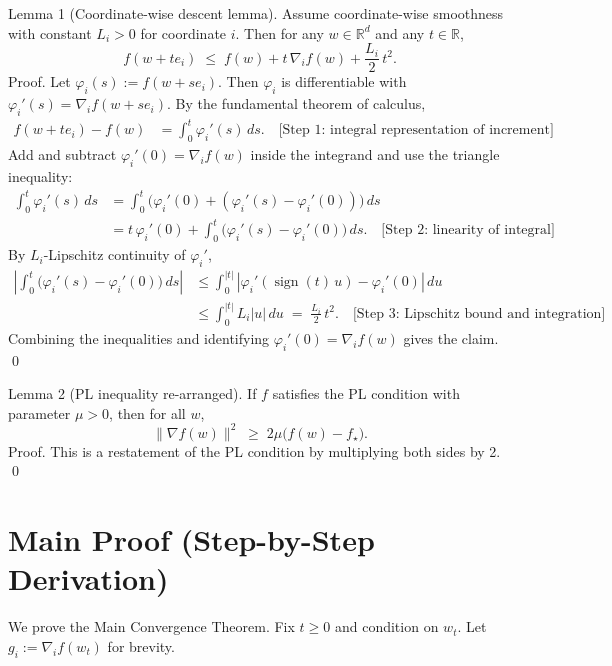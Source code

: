 \documentclass[11pt]{article}
\newcommand{\R}{\mathbb{R}}
\begin{document}
Lemma 1 (Coordinate-wise descent lemma).
Assume coordinate-wise smoothness with constant $L_i>0$ for coordinate $i$. Then for any $w\in\R^d$ and any $t\in\R$,
\[
f(w + t e_i) \;\le\; f(w) + t\,\nabla_i f(w) + \frac{L_i}{2}\,t^2.
\]
Proof.
Let $\varphi_i(s):=f(w+s e_i)$. Then $\varphi_i$ is differentiable with $\varphi_i'(s)=\nabla_i f(w+s e_i)$. By the fundamental theorem of calculus,
\begin{align*}
f(w+te_i)-f(w) &= \int_{0}^{t} \varphi_i'(s)\,ds. \quad\text{[Step 1: integral representation of increment]}
\end{align*}
Add and subtract $\varphi_i'(0)=\nabla_i f(w)$ inside the integrand and use the triangle inequality:
\begin{align*}
\int_{0}^{t} \varphi_i'(s)\,ds &= \int_{0}^{t} \big(\varphi_i'(0) + (\varphi_i'(s)-\varphi_i'(0))\big)\,ds \\
&= t\,\varphi_i'(0) + \int_{0}^{t} \big(\varphi_i'(s)-\varphi_i'(0)\big)\,ds. \quad\text{[Step 2: linearity of integral]}
\end{align*}
By $L_i$-Lipschitz continuity of $\varphi_i'$,
\begin{align*}
\left|\int_{0}^{t} \big(\varphi_i'(s)-\varphi_i'(0)\big)\,ds\right| &\le \int_{0}^{|t|} \left|\varphi_i'(\operatorname{sign}(t)\,u)-\varphi_i'(0)\right|\,du \\
&\le \int_{0}^{|t|} L_i |u|\,du \;=\; \frac{L_i}{2}\,t^2. \quad\text{[Step 3: Lipschitz bound and integration]}
\end{align*}
Combining the inequalities and identifying $\varphi_i'(0)=\nabla_i f(w)$ gives the claim. \qed

Lemma 2 (PL inequality re-arranged).
If $f$ satisfies the PL condition with parameter $\mu>0$, then for all $w$,
\[
\|\nabla f(w)\|^2 \;\ge\; 2\mu\bigl(f(w)-f_\star\bigr).
\]
Proof. This is a restatement of the PL condition by multiplying both sides by 2. \qed

\section*{Main Proof (Step-by-Step Derivation)}
We prove the Main Convergence Theorem. Fix $t\ge 0$ and condition on $w_t$. Let $g_i := \nabla_i f(w_t)$ for brevity.
\end{document}
